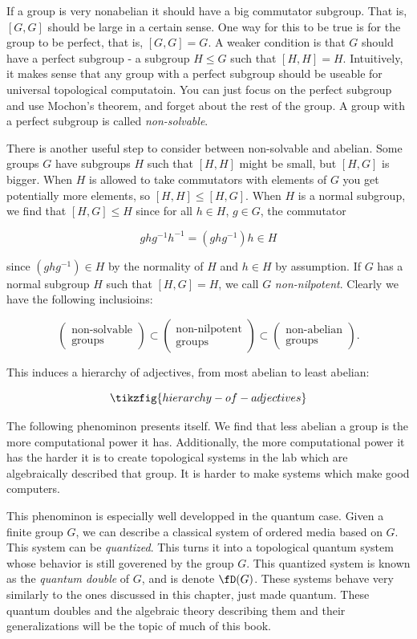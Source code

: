 If a group is very nonabelian it should have a big commutator subgroup. That is, $[G,G]$ should be large in a certain sense. One way for this to be true is for the group to be perfect, that is, $[G,G]=G$. A weaker condition is that $G$ should have a perfect subgroup - a subgroup $H\leq G$ such that $[H,H]=H$. Intuitively, it makes sense that any group with a perfect subgroup should be useable for universal topological computatoin. You can just focus on the perfect subgroup and use Mochon's theorem, and forget about the rest of the group. A group with a perfect subgroup is called \textit{non-solvable}.

There is another useful step to consider between non-solvable and abelian. Some groups $G$ have subgroups $H$ such that $[H,H]$ might be small, but $[H,G]$ is bigger. When $H$ is allowed to take commutators with elements of $G$ you get potentially more elements, so $[H,H]\leq [H,G]$. When $H$ is a normal subgroup, we find that $[H,G]\leq H$ since for all $h\in H$, $g\in G$, the commutator

$$g h g^{-1} h^{-1}= (g h g^{-1}) h \in H$$

since $(g h g^{-1}) \in H$ by the normality of $H$ and $h\in H$ by assumption. If $G$ has a normal subgroup $H$ such that $[H,G]=H$, we call $G$ \textit{non-nilpotent}. Clearly we have the following inclusioins:

$$
\left(\substack{\text{non-solvable} \\ \text{groups}}\right)\subset
\left(\substack{\text{non-nilpotent} \\ \text{groups}}\right)\subset
\left(\substack{\text{non-abelian} \\ \text{groups}}\right).
$$

This induces a hierarchy of adjectives, from most abelian to least abelian:

\begin{equation*}
\tikzfig{hierarchy-of-adjectives}
\end{equation*}


The following phenominon presents itself. We find that less abelian a group is the more computational power it has. Additionally, the more computational power it has the harder it is to create topological systems in the lab which are algebraically described that group. It is harder to make systems which make good computers.

This phenominon is especially well developped in the quantum case. Given a finite group $G$, we can describe a classical system of ordered media based on $G$. This system can be \textit{quantized}. This turns it into a topological quantum system whose behavior is still goverened by the group $G$. This quantized system is known as the \textit{quantum double} of $G$, and is denote $\fD(G)$. These systems behave very similarly to the ones discussed in this chapter, just made quantum. These quantum doubles and the algebraic theory describing them and their generalizations will be the topic of much of this book.

